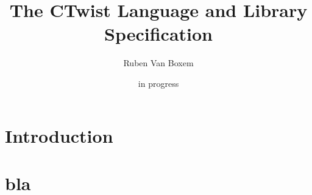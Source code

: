 \documentclass[a4paper,11pt]{article}
\title{The CTwist Language and Library Specification}
\date{in progress}
\author{Ruben Van Boxem}
\begin{document}
\maketitle

\newpage

\tableofcontents
\thispagestyle{empty}
\newpage

\section{Introduction}

\section{bla}
\end{document}
